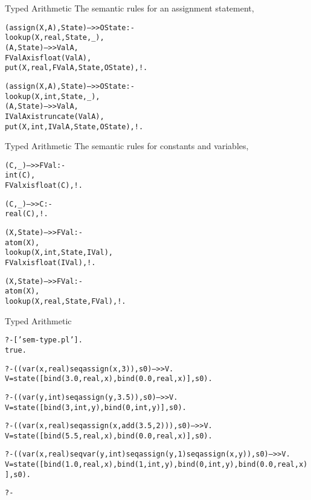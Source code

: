 \documentclass{beamer}
\begin{document}
\begin{frame}[fragile]{Typed Arithmetic}
The semantic rules for an assignment statement,
{\tiny
\begin{alltt}
(assign(X,A),State) -->> OState :-      % assignment to real var  %decl%
    lookup(X,{\color{red}real},State,_),
    (A,State) -->> ValA,
    {\color{red}FValA xis float(ValA)},
    put(X,real,FValA,State,OState),!.

(assign(X,A),State) -->> OState :-     % assignment to int var  %decl%
    lookup(X,{\color{red}int},State,_),
    (A,State) -->> ValA,
    {\color{red}IValA xis truncate(ValA)},
    put(X,int,IValA,State,OState),!.
\end{alltt}
}
\end{frame}

\begin{frame}[fragile]{Typed Arithmetic}
The semantic rules for constants and variables,
{\tiny
\begin{alltt}
(C,_) -->> FVal :-                  % int constants %decl%
    int(C),
    {\color{red}FVal xis float(C)},!.              % promote from int to real

(C,_) -->> C :-                     % real constants %decl%
    real(C),!.

(X,State) -->> FVal :-              % int variables %decl%
    atom(X),
    lookup(X,{\color{red}int},State,IVal),
    {\color{red}FVal xis float(IVal)},!.

(X,State) -->> FVal :-              % real variables %decl%
    atom(X),
    lookup(X,{\color{red}real},State,FVal),!.

\end{alltt}
}
\end{frame}


\begin{frame}[fragile]{Typed Arithmetic}
\tiny
\begin{alltt}
?- ['sem-type.pl'].
%   xis.pl compiled 0.01 sec, 7,792 bytes
%  preamble.pl compiled 0.01 sec, 8,956 bytes
%  xis.pl compiled 0.00 sec, 148 bytes
% sem-type.pl compiled 0.01 sec, 16,828 bytes
true.

?- ((var(x, real) seq assign(x, 3)),s0) -->> V.
V = state([bind(3.0, real, x), bind(0.0, real, x)], s0).

?- ((var(y, int) seq assign(y, 3.5)),s0) -->> V.
V = state([bind(3, int, y), bind(0, int, y)], s0).

?- ((var(x, real) seq assign(x, add(3.5, 2))),s0) -->> V.
V = state([bind(5.5, real, x), bind(0.0, real, x)], s0).

?- ((var(x, real) seq var(y, int) seq assign(y,1) seq assign(x, y)),s0) -->> V.
V = state([bind(1.0, real, x), bind(1, int, y), bind(0, int, y), bind(0.0, real, x)], s0).

?- 
\end{alltt}
\end{frame}
\end{document}
